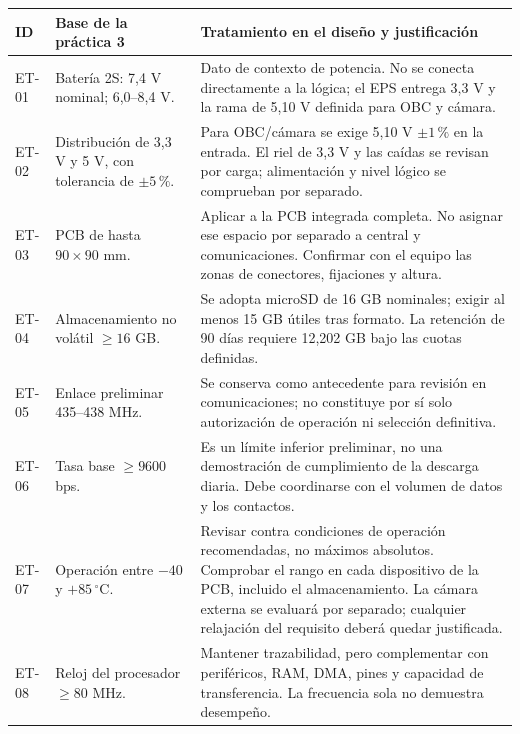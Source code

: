 \documentclass[11pt,letterpaper]{article}
\begin{document}
\begin{longtable}{L{1.4cm}L{4.1cm}L{8.9cm}}
\toprule ID & Base de la práctica 3 & Tratamiento en el diseño y justificación \\
\midrule\endhead
ET-01 & Batería 2S: 7,4 V nominal; 6,0--8,4 V. & Dato de contexto de potencia. No se conecta directamente a la lógica; el EPS entrega 3,3 V y la rama de 5,10 V definida para OBC y cámara. \\
ET-02 & Distribución de 3,3 V y 5 V, con tolerancia de $\pm5\,\%$. & Para OBC/cámara se exige 5,10 V $\pm1\,\%$ en la entrada. El riel de 3,3 V y las caídas se revisan por carga; alimentación y nivel lógico se comprueban por separado. \\
ET-03 & PCB de hasta $90\times90$ mm. & Aplicar a la PCB integrada completa. No asignar ese espacio por separado a central y comunicaciones. Confirmar con el equipo las zonas de conectores, fijaciones y altura. \\
ET-04 & Almacenamiento no volátil $\geq16$ GB. & Se adopta microSD de 16 GB nominales; exigir al menos 15 GB útiles tras formato. La retención de 90 días requiere 12,202 GB bajo las cuotas definidas. \\
ET-05 & Enlace preliminar 435--438 MHz. & Se conserva como antecedente para revisión en comunicaciones; no constituye por sí solo autorización de operación ni selección definitiva. \\
ET-06 & Tasa base $\geq9600$ bps. & Es un límite inferior preliminar, no una demostración de cumplimiento de la descarga diaria. Debe coordinarse con el volumen de datos y los contactos. \\
ET-07 & Operación entre $-40$ y $+85\,^{\circ}\mathrm{C}$. & Revisar contra condiciones de operación recomendadas, no máximos absolutos. Comprobar el rango en cada dispositivo de la PCB, incluido el almacenamiento. La cámara externa se evaluará por separado; cualquier relajación del requisito deberá quedar justificada. \\
ET-08 & Reloj del procesador $\geq80$ MHz. & Mantener trazabilidad, pero complementar con periféricos, RAM, DMA, pines y capacidad de transferencia. La frecuencia sola no demuestra desempeño. \\
\bottomrule
\end{longtable}
\normalsize
\end{document}
